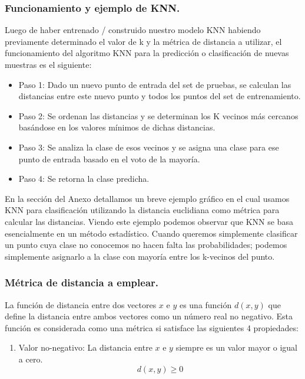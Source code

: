 \documentclass[12pt,a4paper]{article}
\begin{document}
\begin{sloppypar}
\subsubsection{Funcionamiento y ejemplo de KNN.}

Luego de haber entrenado / construido nuestro modelo KNN habiendo previamente determinado el valor de k y la métrica de distancia a utilizar, el funcionamiento del algoritmo KNN para la predicción o clasificación de nuevas muestras es el siguiente: 

\begin{itemize}
\item Paso 1: Dado un nuevo punto de entrada del set de pruebas, se calculan las distancias entre este nuevo punto y todos los puntos del set de entrenamiento.
\item Paso 2: Se ordenan las distancias y se determinan los K vecinos más cercanos basándose en los valores mínimos de dichas distancias.
\item Paso 3: Se analiza la clase de esos vecinos y se asigna una clase para ese punto de entrada basado en el voto de la mayoría.
\item Paso 4: Se retorna la clase predicha.
\end{itemize}

En la sección del Anexo \textit{} detallamos un breve ejemplo gráfico en el cual usamos KNN para clasificación utilizando la distancia euclidiana como métrica para calcular las distancias. Viendo este ejemplo podemos observar que KNN se basa esencialmente en un método estadístico. Cuando queremos simplemente clasificar un punto cuya clase no conocemos no hacen falta las probabilidades; podemos simplemente asignarlo a la clase con mayoría entre los k-vecinos del punto.

\cleardoublepage

\subsubsection{Métrica de distancia a emplear.}\label{metrica_dist_emp}

La función de distancia entre dos vectores $x$ e $y$ es una función $d(x,y)$ que define la distancia entre ambos vectores como un número real no negativo. Esta función es considerada como una métrica si satisface las siguientes 4 propiedades\cite{KNN_Ejemplo}: 

\begin{enumerate}
\item Valor no-negativo: La distancia entre $x$ e $y$ siempre es un valor mayor o igual a cero. 
$$d(x,y) \geq 0$$


\end{enumerate}
\end{sloppypar}
\end{document}
